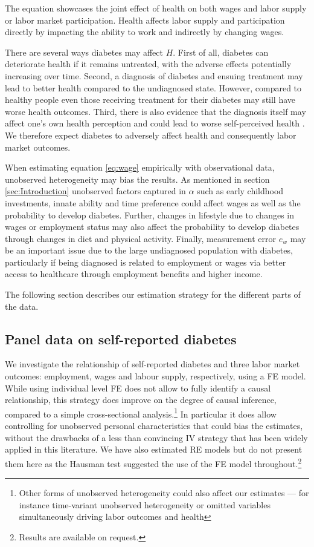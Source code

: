 \documentclass[12pt,english]{article}
\begin{document}
{The equation showcases the joint effect of health on both wages and labor supply or labor market participation. Health affects labor supply and participation directly by impacting the ability to work and indirectly by changing wages.

There are several ways diabetes may affect $H$. First of all, diabetes can deteriorate health if it remains untreated, with the adverse effects potentially increasing over time. Second, a diagnosis of diabetes and ensuing treatment may lead to better health compared to the undiagnosed state. However, compared to healthy people even those receiving treatment for their diabetes may still have worse health outcomes. Third, there is also evidence that the diagnosis itself may affect one's own health perception and could lead to worse self-perceived health \parencite{Thoolen2006}. We therefore expect diabetes to adversely affect health and consequently labor market outcomes.

When estimating equation  \ref{eq:wage} empirically with observational data, unobserved heterogeneity may bias the results. As mentioned in section  \ref{sec:Introduction} unobserved factors captured in $\alpha$ such as early childhood investments, innate ability and time preference could affect wages as well as the probability to develop diabetes. Further, changes in lifestyle due to changes in wages or employment status may also affect the probability to develop diabetes through changes in diet and physical activity. Finally, measurement error $e_w$ may be an important issue due to the large undiagnosed population with diabetes, particularly if being diagnosed is related to employment or wages via better access to healthcare through employment benefits and higher income.

The following section describes our estimation strategy for the different parts of the data.


\subsection{Panel data on self-reported diabetes}

We investigate the relationship of self-reported diabetes and three
labor market outcomes: employment, wages and labour supply, respectively, using a \ac{FE} model. While using individual level \ac{FE} does not allow to fully identify a causal relationship, this strategy does improve on the degree of causal inference, compared to a simple cross-sectional analysis.\footnote{Other forms of unobserved heterogeneity could also affect our estimates --- for instance time-variant unobserved heterogeneity or omitted variables simultaneously driving labor outcomes and health} In particular it does allow controlling for unobserved personal characteristics that could bias the estimates, without the drawbacks of a less than convincing \ac{IV} strategy that has been widely applied in this literature. We have also estimated \ac{RE} models but do not present them here as the Hausman test suggested the use of the \ac{FE} model throughout.\footnote{Results are available on request.}


}
\end{document}
